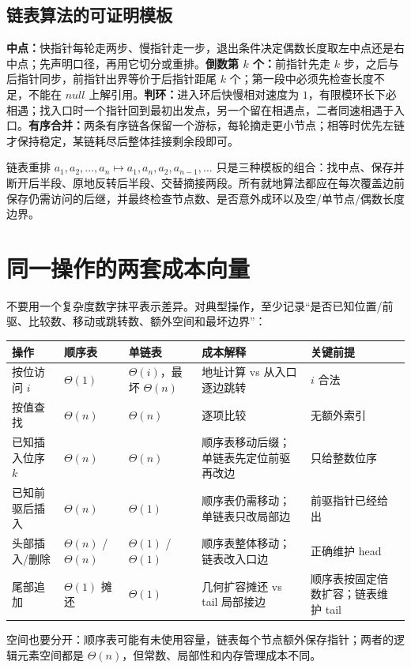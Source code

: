 \documentclass[UTF8,fontset=none,11pt,a4paper]{ctexart}
\begin{document}
\subsection{链表算法的可证明模板}
\textbf{中点：}快指针每轮走两步、慢指针走一步，退出条件决定偶数长度取左中点还是右中点；先声明口径，再用它切分或重排。\textbf{倒数第 $k$ 个：}前指针先走 $k$ 步，之后与后指针同步，前指针出界等价于后指针距尾 $k$ 个；第一段中必须先检查长度不足，不能在 $null$ 上解引用。\textbf{判环：}进入环后快慢相对速度为 $1$，有限模环长下必相遇；找入口时一个指针回到最初出发点，另一个留在相遇点，二者同速相遇于入口。\textbf{有序合并：}两条有序链各保留一个游标，每轮摘走更小节点；相等时优先左链才保持稳定，某链耗尽后整体挂接剩余段即可。

链表重排 $a_1,a_2,\ldots,a_n\mapsto a_1,a_n,a_2,a_{n-1},\ldots$ 只是三种模板的组合：找中点、保存并断开后半段、原地反转后半段、交替摘接两段。所有就地算法都应在每次覆盖边前保存仍需访问的后继，并最终检查节点数、是否意外成环以及空/单节点/偶数长度边界。

\section{同一操作的两套成本向量}
不要用一个复杂度数字抹平表示差异。对典型操作，至少记录“是否已知位置/前驱、比较数、移动或跳转数、额外空间和最坏边界”：
\begin{center}\small
\begin{tabularx}{\linewidth}{L{2.5cm}C{1.8cm}C{1.8cm}YY}
\toprule
操作 & 顺序表 & 单链表 & 成本解释 & 关键前提\\
\midrule
按位访问 $i$ & $\Theta(1)$ & $\Theta(i)$，最坏 $\Theta(n)$ & 地址计算 vs 从入口逐边跳转 & $i$ 合法\\
按值查找 & $\Theta(n)$ & $\Theta(n)$ & 逐项比较 & 无额外索引\\
已知插入位序 $k$ & $\Theta(n)$ & $\Theta(n)$ & 顺序表移动后缀；单链表先定位前驱再改边 & 只给整数位序\\
已知前驱后插入 & $\Theta(n)$ & $\Theta(1)$ & 顺序表仍需移动；单链表只改局部边 & 前驱指针已经给出\\
头部插入/删除 & $\Theta(n)$ / $\Theta(n)$ & $\Theta(1)$ / $\Theta(1)$ & 顺序表整体移动；链表改入口边 & 正确维护 head\\
尾部追加 & $\Theta(1)$ 摊还 & $\Theta(1)$ & 几何扩容摊还 vs tail 局部接边 & 顺序表按固定倍数扩容；链表维护 tail\\
\bottomrule
\end{tabularx}\end{center}
空间也要分开：顺序表可能有未使用容量，链表每个节点额外保存指针；两者的逻辑元素空间都是 $\Theta(n)$，但常数、局部性和内存管理成本不同。
\end{document}
